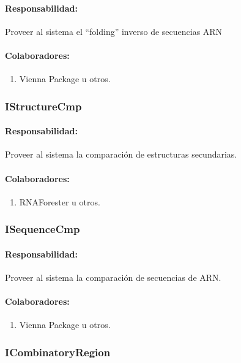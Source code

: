     \paragraph{Responsabilidad:} Proveer al sistema el ``folding'' inverso de
secuencias ARN
    \paragraph{Colaboradores:}
      \begin{enumerate}
       \item Vienna Package u otros.
      \end{enumerate}

  \subsubsection{IStructureCmp}
    \paragraph{Responsabilidad:} Proveer al sistema la comparaci\'on de
estructuras secundarias.
    \paragraph{Colaboradores:}
      \begin{enumerate}
       \item RNAForester u otros.
      \end{enumerate}

  \subsubsection{ISequenceCmp}
    \paragraph{Responsabilidad:} Proveer al sistema la comparaci\'on de
secuencias de ARN.
    \paragraph{Colaboradores:}
      \begin{enumerate}
       \item Vienna Package u otros.
      \end{enumerate}

  \subsubsection{ICombinatoryRegion}
